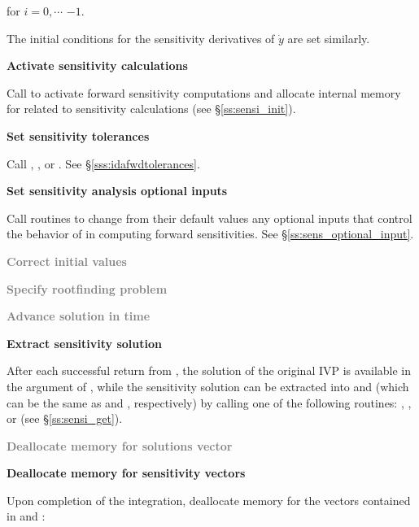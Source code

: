\begin{Steps}
  for $i = 0,\cdots$  $-1$.

  The initial conditions for the sensitivity derivatives  of $\dot{y}$
  are set similarly.

\item
  {\bf Activate sensitivity calculations}

  Call \id{(\ldots);} to activate forward 
  sensitivity computations and allocate internal memory for {\idas} related 
  to sensitivity calculations (see \S\ref{ss:sensi_init}).

\item
  {\bf Set sensitivity tolerances}

  Call , , or .
  See \S\ref{sss:idafwdtolerances}.

\item
  {\bf Set sensitivity analysis optional inputs}

  Call  routines to change from their default values any
  optional inputs that control the behavior of {\idas} in computing forward 
  sensitivities.  See \S\ref{ss:sens_optional_input}.

\item
  \textcolor{gray}{\bf Correct initial values}

\item
  \textcolor{gray}{\bf Specify rootfinding problem}

\item
  \textcolor{gray}{\bf Advance solution in time}

\item
  {\bf Extract sensitivity solution}

  After each successful return from , the solution of the
  original IVP is available in the  argument of ,
  while the sensitivity solution can be extracted into  and 
  (which can be the same as  and , respectively) by calling 
  one of the following routines: , , 
   or  (see \S\ref{ss:sensi_get}).

\item
  \textcolor{gray}{\bf Deallocate memory for solutions vector}

\item 
  {\bf Deallocate memory for sensitivity vectors}

  Upon completion of the integration, deallocate memory for the vectors contained
  in  and :


\end{Steps}
